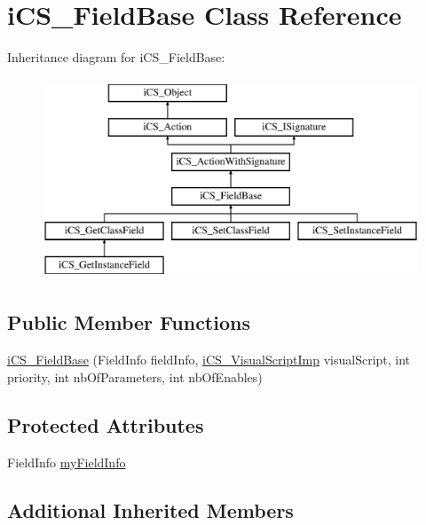 \hypertarget{classi_c_s___field_base}{\section{i\+C\+S\+\_\+\+Field\+Base Class Reference}
\label{classi_c_s___field_base}
}
Inheritance diagram for i\+C\+S\+\_\+\+Field\+Base\+:\begin{figure}[H]
\begin{center}
\leavevmode
\includegraphics[height=6.000000cm]{classi_c_s___field_base}
\end{center}
\end{figure}
\subsection*{Public Member Functions}
\begin{DoxyCompactItemize}
\item 
\hyperlink{classi_c_s___field_base_a950f9a615b0609bf468a37e39881b762}{i\+C\+S\+\_\+\+Field\+Base} (Field\+Info field\+Info, \hyperlink{classi_c_s___visual_script_imp}{i\+C\+S\+\_\+\+Visual\+Script\+Imp} visual\+Script, int priority, int nb\+Of\+Parameters, int nb\+Of\+Enables)
\end{DoxyCompactItemize}
\subsection*{Protected Attributes}
\begin{DoxyCompactItemize}
\item 
Field\+Info \hyperlink{classi_c_s___field_base_a7631b9b73a7073f020809eb1a28c769c}{my\+Field\+Info}
\end{DoxyCompactItemize}
\subsection*{Additional Inherited Members}


